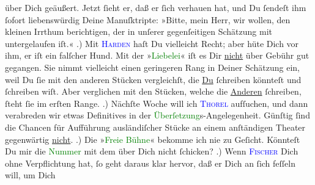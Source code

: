                über Dich geäußert. Jetzt ſieht er, daß er ſich verhauen hat, und Du ſendeſt ihm
               ſofort liebenswürdig Deine Manuſktripte: »Bitte, mein Herr, wir wollen, den kleinen
               Irrthum berichtigen, der in unſerer gegenſeitigen Schätzung mit untergelaufen
               iſt.«\pend
           .) Mit \textsc{\textcolor{blue}{Harden}{}\ledrightnote{\textcolor{blue}{Maximilian Harden}}} haſt Du vielleicht Recht; aber hüte Dich vor ihm, er iſt ein falſcher Hund. Mit
               der »\textcolor{green}{Liebelei}{}\ledrightnote{\textcolor{green}{Liebelei. Schauspiel in drei Akten}}« iſt es Dir \uline{nicht} über Gebühr gut gegangen. {\pb}Sie
               nimmt vielleicht einen geringeren Rang in Deiner Schätzung ein, weil Du ſie mit den
               anderen Stücken vergleichſt, die \uline{Du} ſchreiben
               könnteſt und ſchreiben wiſt. Aber verglichen mit den Stücken, welche die \uline{Anderen} ſchreiben, ſteht ſie im erſten Range.\pend
           .) Nächſte Woche will ich \textsc{\textcolor{blue}{Thorel}{}\ledrightnote{\textcolor{blue}{Jean Thorel}}} aufſuchen, und dann verabreden wir etwas Definitives in der \textcolor{green}{Überſetzung}{}s-Angelegenheit. Günſtig ſind
               die Chancen für Aufführung ausländiſcher {\pb}Stücke an
               einem anſtändigen Theater gegenwärtig \uline{nicht}.\pend
           .) Die »\textcolor{green}{Freie Bühne}{}\ledrightnote{\textcolor{green}{Neue Deutsche Rundschau}}« bekomme ich nie zu
               Geſicht. Könnteſt Du mir die \textcolor{green}{Nummer}{} mit dem \label{K_L02774-4v}\label{K_L02774-4h} über Dich nicht
               ſchicken?\pend
           .) Wenn \textsc{\textcolor{brown}{\textcolor{blue}{Fischer}{}\ledrightnote{\textcolor{blue}{Samuel Fischer}}}{}\ledrightnote{\textcolor{brown}{S. Fischer Verlag}}} Dich \strikeout{\textcolor{gray}{o}} ohne Verpflichtung \label{K_L02774-6v}\label{K_L02774-6h} hat, ſo geht daraus klar hervor, daß er Dich an ſich feſſeln will, um Dich
